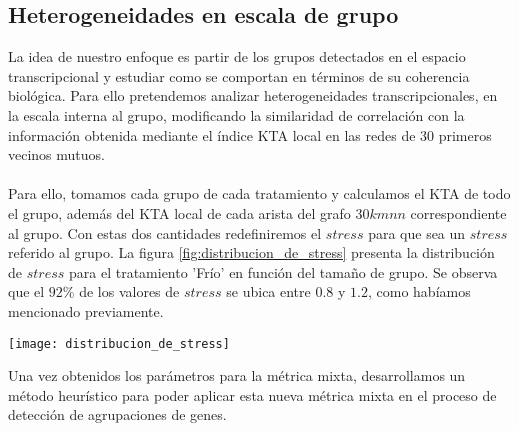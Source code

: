 \subsection{Heterogeneidades en escala de grupo}
La idea de nuestro enfoque es partir de los grupos detectados en el espacio transcripcional y estudiar como se comportan en términos de su coherencia biológica. Para ello pretendemos analizar heterogeneidades transcripcionales, en la escala interna al grupo, modificando la similaridad de correlación con la información obtenida mediante el índice KTA local en las redes de 30 primeros vecinos mutuos.\\\\
Para ello, tomamos cada grupo de cada tratamiento y calculamos el KTA de todo el grupo, además del KTA local de cada arista del grafo $30kmnn$ correspondiente al grupo. Con estas dos cantidades redefiniremos el $stress$ para que sea un $stress$ referido al grupo. La figura \ref{fig:distribucion_de_stress} presenta la distribución de $stress$ para el tratamiento 'Frío' en función del tamaño de grupo. Se observa que el $92\%$ de los valores de $stress$ se ubica entre $0.8$ y $1.2$, como habíamos mencionado previamente. 
\begin{center}
\texttt{[image: distribucion\_de\_stress]}
\label{fig:distribucion_de_stress}
\end{center}
Una vez obtenidos los parámetros para la métrica mixta, desarrollamos un método heurístico para poder aplicar esta nueva métrica mixta en el proceso de detección de agrupaciones de genes.

